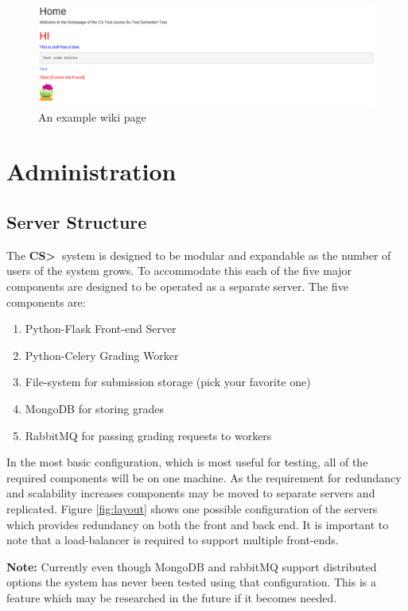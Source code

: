 \documentclass[11pt]{report}
\newcommand{\csgt}[0]{\textbf{CS\textgreater\ }}
\begin{document}
\begin{figure}
\centering
\includegraphics[width=\textwidth,height=\textheight,keepaspectratio]{diagrams/example_wiki}
\caption{An example wiki page}
\label{fig:wiki_example}
\end{figure}



\chapter{Administration}
\label{ch:admin}
\section{Server Structure}
The \csgt system is designed to be modular and expandable as the number of users of the system grows.
To accommodate this each of the five major components are designed to be operated as a separate server.
The five components are:

\begin{enumerate}
\item Python-Flask Front-end Server
\item Python-Celery Grading Worker
\item File-system for submission storage (pick your favorite one)
\item MongoDB for storing grades
\item RabbitMQ for passing grading requests to workers
\end{enumerate}

In the most basic configuration, which is most useful for testing, all of the required components will be
on one machine. As the requirement for redundancy and scalability increases components may be moved to
separate servers and replicated. Figure \ref{fig:layout} shows one possible configuration of the servers
which provides redundancy on both the front and back end. It is important to note that a load-balancer is
required to support multiple front-ends.

\textbf{Note:} Currently even though MongoDB and rabbitMQ support distributed options the system has never
been tested using that configuration. This is a feature which may be researched in the future if it becomes
needed.
\end{document}
